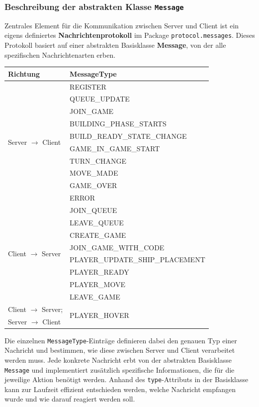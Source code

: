 \documentclass[12pt]{article}
\begin{document}
\subsubsection*{Beschreibung der abstrakten Klasse \texttt{Message}}

Zentrales Element für die Kommunikation zwischen Server und Client ist ein eigens definiertes 
\textbf{Nachrichtenprotokoll} im Package \texttt{protocol.messages}. Dieses Protokoll basiert auf 
einer abstrakten Basisklasse \textbf{Message}, von der alle spezifischen Nachrichtenarten erben.


\begin{table}[h]
    \centering
    \begin{tabular}{|l|l|}
    \hline
    \textbf{Richtung} & \textbf{MessageType} \\
    \hline
    \multirow{10}{*}{Server $\rightarrow$ Client} 
        & REGISTER \\
        & QUEUE\_UPDATE \\
        & JOIN\_GAME \\
        & BUILDING\_PHASE\_STARTS \\
        & BUILD\_READY\_STATE\_CHANGE \\
        & GAME\_IN\_GAME\_START \\
        & TURN\_CHANGE \\
        & MOVE\_MADE \\
        & GAME\_OVER \\
        & ERROR \\
    \hline
    \multirow{8}{*}{Client $\rightarrow$ Server} 
        & JOIN\_QUEUE \\
        & LEAVE\_QUEUE \\
        & CREATE\_GAME \\
        & JOIN\_GAME\_WITH\_CODE \\
        & PLAYER\_UPDATE\_SHIP\_PLACEMENT \\
        & PLAYER\_READY \\
        & PLAYER\_MOVE \\
        & LEAVE\_GAME \\
    \hline
    Client $\rightarrow$ Server; & \multirow{2}{*}{PLAYER\_HOVER} \\
    Server $\rightarrow$ Client & \\
    \hline
    \end{tabular}
    \end{table}

Die einzelnen \texttt{MessageType}-Einträge definieren dabei den genauen Typ einer Nachricht 
und bestimmen, wie diese zwischen Server und Client verarbeitet werden muss. 
Jede konkrete Nachricht erbt von der abstrakten Basisklasse \texttt{Message} und implementiert 
zusätzlich spezifische Informationen, die für die jeweilige Aktion benötigt werden. 
Anhand des \texttt{type}-Attributs in der Basisklasse kann zur Laufzeit effizient entschieden werden, 
welche Nachricht empfangen wurde und wie darauf reagiert werden soll.
\end{document}

